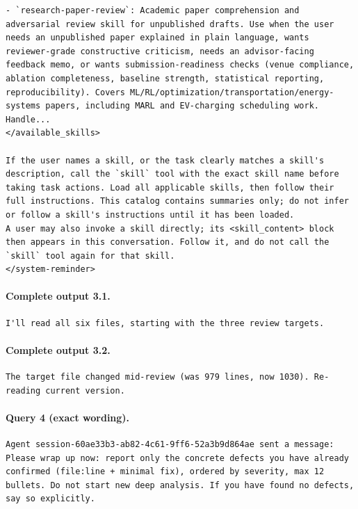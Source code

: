 \documentclass[UTF8,10pt]{ctexart}
\begin{document}
\begin{Verbatim}[breaklines=true,breakanywhere=true,fontsize=\scriptsize,frame=single,framesep=2pt]
- `research-paper-review`: Academic paper comprehension and adversarial review skill for unpublished drafts. Use when the user needs an unpublished paper explained in plain language, wants reviewer-grade constructive criticism, needs an advisor-facing feedback memo, or wants submission-readiness checks (venue compliance, ablation completeness, baseline strength, statistical reporting, reproducibility). Covers ML/RL/optimization/transportation/energy-systems papers, including MARL and EV-charging scheduling work. Handle...
</available_skills>

If the user names a skill, or the task clearly matches a skill's description, call the `skill` tool with the exact skill name before taking task actions. Load all applicable skills, then follow their full instructions. This catalog contains summaries only; do not infer or follow a skill's instructions until it has been loaded.
A user may also invoke a skill directly; its <skill_content> block then appears in this conversation. Follow it, and do not call the `skill` tool again for that skill.
</system-reminder>
\end{Verbatim}

\paragraph{Complete output 3.1.}
\begin{Verbatim}[breaklines=true,breakanywhere=true,fontsize=\scriptsize,frame=single,framesep=2pt]
I'll read all six files, starting with the three review targets.
\end{Verbatim}

\paragraph{Complete output 3.2.}
\begin{Verbatim}[breaklines=true,breakanywhere=true,fontsize=\scriptsize,frame=single,framesep=2pt]
The target file changed mid-review (was 979 lines, now 1030). Re-reading current version.
\end{Verbatim}

\paragraph{Query 4 (exact wording).}
\begin{Verbatim}[breaklines=true,breakanywhere=true,fontsize=\scriptsize,frame=single,framesep=2pt]
Agent session-60ae33b3-ab82-4c61-9ff6-52a3b9d864ae sent a message: 
Please wrap up now: report only the concrete defects you have already confirmed (file:line + minimal fix), ordered by severity, max 12 bullets. Do not start new deep analysis. If you have found no defects, say so explicitly.
\end{Verbatim}
\end{document}
